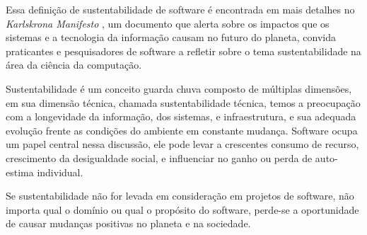 Essa definição de sustentabilidade de software é encontrada em mais detalhes no
{\it Karlskrona Manifesto} \cite{becker2014karlskrona}, um documento que alerta
sobre os impactos que os sistemas e a tecnologia da informação causam no futuro
do planeta, convida praticantes e pesquisadores de software a refletir sobre
o tema sustentabilidade na área da ciência da computação.

Sustentabilidade é um conceito guarda chuva composto de múltiplas dimensões, em
sua dimensão técnica, chamada sustentabilidade técnica, temos a preocupação com
a longevidade da informação, dos sistemas, e infraestrutura, e sua adequada
evolução frente as condições do ambiente em constante mudança. Software ocupa
um papel central nessa discussão, ele pode levar a crescentes consumo de
recurso, crescimento da desigualdade social, e influenciar no ganho ou perda de
auto-estima individual.

Se sustentabilidade não for levada em consideração em projetos de software, não
importa qual o domínio ou qual o propósito do software, perde-se a oportunidade
de causar mudanças positivas no planeta e na sociedade.


